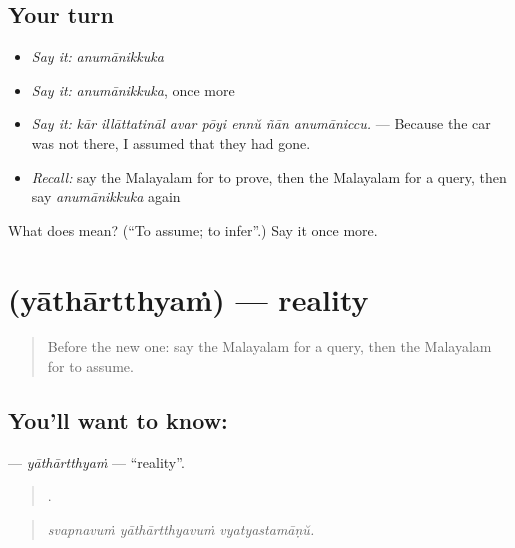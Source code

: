 \subsection*{Your turn}
\begin{itemize}
\raggedright
  \item \emph{Say it:} \emph{anumānikkuka}
  \item \emph{Say it:} \emph{anumānikkuka}, once more
  \item \emph{Say it:} \emph{kār illāttatināl avar pōyi ennŭ ñān anumāniccu.} — Because the car was not there, I assumed that they had gone.
  \item \emph{Recall:} say the Malayalam for to prove, then the Malayalam for a query, then say \emph{anumānikkuka} again
\end{itemize}

\begin{tcolorbox}[breakable,colback=teal!4,colframe=teal!35!black,title={Before you move on}]
What does  mean? (\textquotedblleft{}To assume; to infer\textquotedblright{}.) Say it once more.
\end{tcolorbox}
\section[\texorpdfstring{\ml{യാഥാർത്ഥ്യം} (yāthārtthyaṁ)}{യാഥാർത്ഥ്യം (yāthārtthyaṁ)}]{ (yāthārtthyaṁ) — reality}

\label{lesson:ML-C407-yathartthyam}



\begin{quote}
Before the new one: say the Malayalam for a query, then the Malayalam for to assume.
\end{quote}

\subsection*{You'll want to know: }
\textbf{} — \emph{yāthārtthyaṁ} — \textquotedblleft{}reality\textquotedblright{}.

\begin{quote}
  .
\end{quote}

\begin{quote}
\emph{svapnavuṁ yāthārtthyavuṁ vyatyastamāṇŭ.}
\end{quote}

